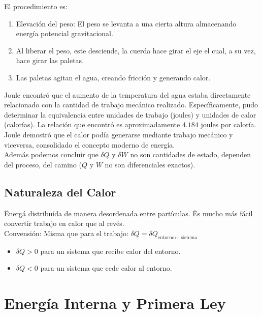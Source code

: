 \begin{enumerate}
\begin{figure}[H]
	\end{figure}
	El procedimiento es:
	\begin{enumerate}
		\item Elevación del peso: El peso se levanta a una cierta altura almacenando energía potencial gravitacional.
		\item Al liberar el peso, este desciende, la cuerda hace girar el eje el cual, a su vez, hace girar las paletas.
		\item Las paletas agitan el agua, creando fricción y generando calor.
	\end{enumerate}
	Joule encontró que el aumento de la temperatura del agua estaba directamente relacionado con la cantidad de trabajo mecánico realizado. Específicamente, pudo determinar la equivalencia entre unidades de trabajo (joules) y unidades de calor (calorías). La relación que encontró es aproximadamente $4.184$ joules por caloría. \\
	Joule demostró que el calor podía generarse mediante trabajo mecánico y viceversa, consolidado el concepto moderno de energía. \\
	Además podemos concluir que $\delta Q$ y $\delta W$ no son cantidades de estado, dependen del proceso, del camino ($Q$ y $W$ no son diferenciales exactos).
\end{enumerate}

\subsection{Naturaleza del Calor}
\" Energá distribuída de manera desordenada entre partículas. \" Es mucho más fácil convertir trabajo en calor que al revés. \\
Convensión: Misma que para el trabajo: $\delta Q = \delta Q_{\text{entorno} \leftarrow \text{ sistema}}$
\begin{itemize}
	\item $\delta Q > 0$ para un sistema que recibe calor del entorno.
	\item $\delta Q < 0$ para un sistema que cede calor al entorno.
\end{itemize}

\section{Energía Interna y Primera Ley}

